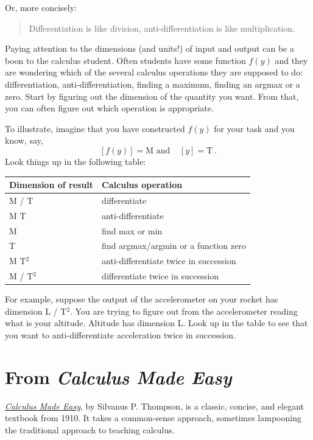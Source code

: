 \documentclass[
  letterpaper,
  DIV=11,
  numbers=noendperiod,
  oneside]{scrreprt}
\begin{document}
Or, more concisely:

\begin{quote}
Differentiation is like division, anti-differentiation is like
multiplication.
\end{quote}

Paying attention to the dimensions (and units!) of input and output can
be a boon to the calculus student. Often students have some function
\(f(y)\) and they are wondering which of the several calculus operations
they are supposed to do: differentiation, anti-differentiation, finding
a maximum, finding an argmax or a zero. Start by figuring out the
dimension of the quantity you want. From that, you can often figure out
which operation is appropriate.

To illustrate, imagine that you have constructed \(f(y)\) for your task
and you know, say,
\[[f(y)] = \text{M       and} \  \ \ \ \ [y] = \text{T}\ .\] Look things
up in the following table:

\begin{longtable}[]{@{}ll@{}}
\toprule
Dimension of result & Calculus operation \\
\midrule
\endhead
M / T & differentiate \\
M T & anti-differentiate \\
M & find max or min \\
T & find argmax/argmin or a function zero \\
M T\(^2\) & anti-differentiate twice in succession \\
M / T\(^2\) & differentiate twice in succession \\
\bottomrule
\end{longtable}

For example, suppose the output of the accelerometer on your rocket has
dimension L / T\(^2\). You are trying to figure out from the
accelerometer reading what is your altitude. Altitude has dimension L.
Look up in the table to see that you want to anti-differentiate
acceleration twice in succession.

\hypertarget{sec-preliminary-terrors}{%
\section{\texorpdfstring{From \emph{Calculus Made
Easy}}{From Calculus Made Easy}}\label{sec-preliminary-terrors}}

\href{https://en.wikipedia.org/wiki/Calculus_Made_Easy}{\emph{Calculus
Made Easy}}, by Silvanus P. Thompson, is a classic, concise, and elegant
textbook from 1910. It takes a common-sense approach, sometimes
lampooning the traditional approach to teaching calculus.
\end{document}
